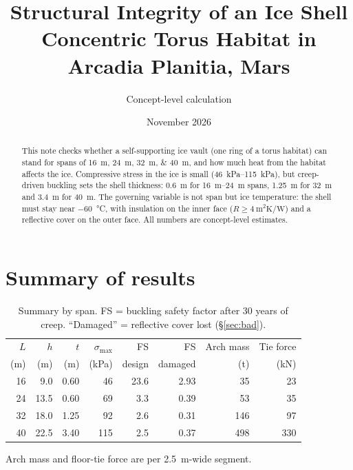 \documentclass[11pt,a4paper]{article}
\title{Structural Integrity of an Ice Shell\\Concentric Torus Habitat in Arcadia Planitia, Mars}
\author{Concept-level calculation}
\date{November 2026}
\begin{document}
\maketitle

\begin{abstract}
This note checks whether a self-supporting ice vault (one ring of a torus habitat) can stand for spans of \SIlist{16;24;32;40}{\metre}, and how much heat from the habitat affects the ice. Compressive stress in the ice is small (\SIrange{46}{115}{\kilo\pascal}), but creep-driven buckling sets the shell thickness: \SI{0.6}{\metre} for \SIrange{16}{24}{\metre} spans, \SI{1.25}{\metre} for \SI{32}{\metre} and \SI{3.4}{\metre} for \SI{40}{\metre}. The governing variable is not span but ice temperature: the shell must stay near \SI{-60}{\celsius}, with insulation on the inner face ($R \geq \SI{4}{\metre\squared\kelvin\per\watt}$) and a reflective cover on the outer face. All numbers are concept-level estimates.
\end{abstract}

\section{Summary of results}
\begin{table}[h]\centering\small
\caption{Summary by span. FS = buckling safety factor after 30 years of creep. ``Damaged'' = reflective cover lost (\S\ref{sec:bad}).}
\begin{tabular}{rrrrrrrr}\toprule
$L$ & $h$ & $t$ & $\sigma_{\max}$ & FS & FS & Arch mass & Tie force \\
(\si{\metre}) & (\si{\metre}) & (\si{\metre}) & (\si{\kilo\pascal}) & design & damaged & (\si{\tonne}) & (\si{\kilo\newton}) \\\midrule
\num{16} & \num{9.0} & \num{0.60} & \num{46} & \num{23.6} & \num{2.93} & \num{35} & \num{23} \\
\num{24} & \num{13.5} & \num{0.60} & \num{69} & \num{3.3} & \num{0.39} & \num{53} & \num{35} \\
\num{32} & \num{18.0} & \num{1.25} & \num{92} & \num{2.6} & \num{0.31} & \num{146} & \num{97} \\
\num{40} & \num{22.5} & \num{3.40} & \num{115} & \num{2.5} & \num{0.37} & \num{498} & \num{330} \\
\bottomrule\end{tabular}
\end{table}
Arch mass and floor-tie force are per \SI{2.5}{\metre}-wide segment.
\end{document}
